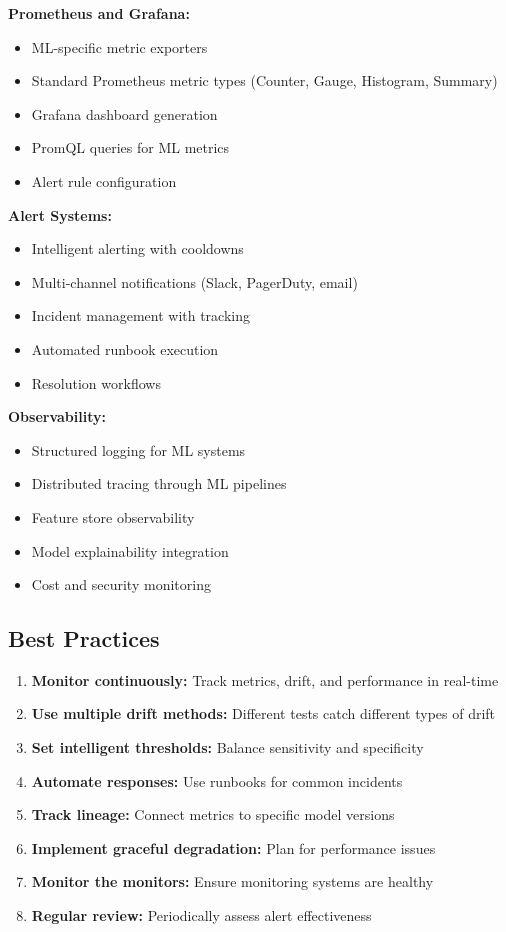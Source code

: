 \textbf{Prometheus and Grafana:}
\begin{itemize}
    \item ML-specific metric exporters
    \item Standard Prometheus metric types (Counter, Gauge, Histogram, Summary)
    \item Grafana dashboard generation
    \item PromQL queries for ML metrics
    \item Alert rule configuration
\end{itemize}

\textbf{Alert Systems:}
\begin{itemize}
    \item Intelligent alerting with cooldowns
    \item Multi-channel notifications (Slack, PagerDuty, email)
    \item Incident management with tracking
    \item Automated runbook execution
    \item Resolution workflows
\end{itemize}

\textbf{Observability:}
\begin{itemize}
    \item Structured logging for ML systems
    \item Distributed tracing through ML pipelines
    \item Feature store observability
    \item Model explainability integration
    \item Cost and security monitoring
\end{itemize}

\subsection{Best Practices}

\begin{enumerate}
    \item \textbf{Monitor continuously:} Track metrics, drift, and performance in real-time
    \item \textbf{Use multiple drift methods:} Different tests catch different types of drift
    \item \textbf{Set intelligent thresholds:} Balance sensitivity and specificity
    \item \textbf{Automate responses:} Use runbooks for common incidents
    \item \textbf{Track lineage:} Connect metrics to specific model versions
    \item \textbf{Implement graceful degradation:} Plan for performance issues
    \item \textbf{Monitor the monitors:} Ensure monitoring systems are healthy
    \item \textbf{Regular review:} Periodically assess alert effectiveness
\end{enumerate}

